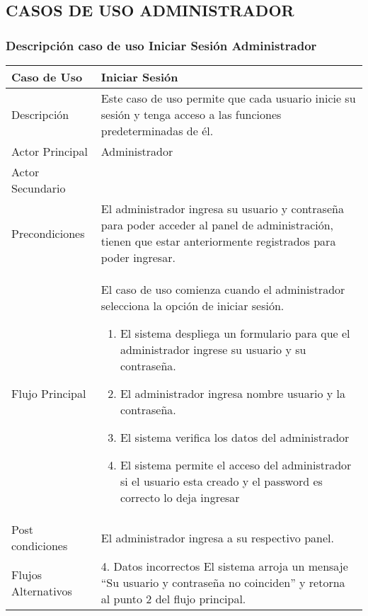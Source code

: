 \documentclass[12pt,a4paper]{article}
\begin{document}
    \newpage
    \subsection*{CASOS DE USO ADMINISTRADOR}
    \subsubsection*{Descripción caso de uso Iniciar Sesión Administrador}
    \begin{table}[h]
            \centering
            \begin{tabular}{| p{3cm}| p{11cm} |} 
            \hline  
            Caso de Uso         &    \textbf{Iniciar Sesión }   \\ 
            \hline
            Descripción         &   Este caso de uso permite que cada usuario inicie su sesión y tenga acceso a las funciones predeterminadas de él.    \\ 
            \hline
            Actor Principal     &   Administrador   \\ 
            \hline
            Actor Secundario    &       \\ 
            \hline
            Precondiciones      &    El administrador ingresa su usuario y contraseña para poder acceder al panel de administración, tienen que estar anteriormente registrados para poder ingresar. 	\\
            \hline
            Flujo Principal     &    El caso de uso comienza cuando el administrador selecciona la opción de iniciar sesión.
    
                \begin{enumerate}
                    \item El sistema despliega un formulario para que el administrador ingrese su usuario y su contraseña.
                    \item El administrador ingresa nombre usuario y la contraseña.
                    \item El sistema verifica los datos del administrador
                    \item El sistema permite el acceso del administrador si el usuario esta creado y el password es correcto lo deja ingresar
                \end{enumerate}
            \\  
            \hline
            Post condiciones    &     El administrador ingresa a su respectivo panel.  \\  
            \hline
            Flujos Alternativos &   4. Datos incorrectos
            El sistema arroja un mensaje “Su usuario y contraseña no coinciden” y retorna al punto 2 del flujo principal.    \\  
            \hline
            \end{tabular}
        \end{table}
\end{document}
